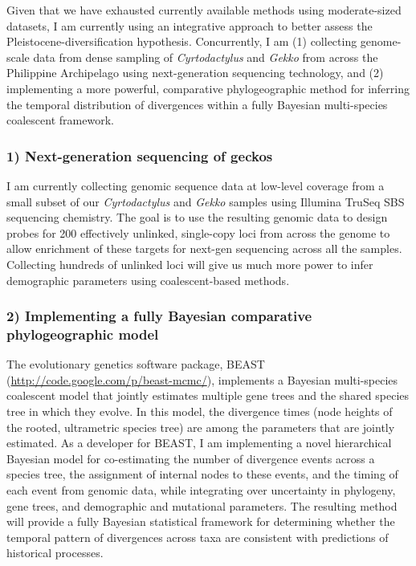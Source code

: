 \documentclass[10pt]{article}
\begin{document}



Given that we have exhausted currently available methods using moderate-sized
datasets, I am currently using an integrative approach to better assess the
Pleistocene-diversification hypothesis.  Concurrently, I am (1) collecting
genome-scale data from dense sampling of \emph{Cyrtodactylus} and \emph{Gekko}
from across the Philippine Archipelago using next-generation sequencing
technology, and (2) implementing a more powerful, comparative phylogeographic
method for inferring the temporal distribution of divergences within a fully
Bayesian multi-species coalescent framework.

\subsubsection*{1) Next-generation sequencing of geckos}
I am currently collecting genomic sequence data at low-level coverage from a
small subset of our \emph{Cyrtodactylus} and \emph{Gekko} samples using
Illumina TruSeq SBS sequencing chemistry.
The goal is to use the resulting genomic data to design probes for 200
effectively unlinked, single-copy loci from across the genome to allow
enrichment of these targets for next-gen sequencing across all the samples.
Collecting hundreds of unlinked loci will give us much more power to infer
demographic parameters using coalescent-based methods.

\subsubsection*{2) Implementing a fully Bayesian comparative phylogeographic
model}
The evolutionary genetics software package, BEAST
(\url{http://code.google.com/p/beast-mcmc/}), implements a Bayesian
multi-species coalescent model that jointly estimates multiple gene trees and
the shared species tree in which they evolve.
In this model, the divergence times (node heights of the rooted, ultrametric
species tree) are among the parameters that are jointly estimated.
As a developer for BEAST, I am implementing a novel hierarchical Bayesian model
for co-estimating the number of divergence events across a species tree, the
assignment of internal nodes to these events, and the timing of each event from
genomic data, while integrating over uncertainty in phylogeny, gene trees, and
demographic and mutational parameters.
The resulting method will provide a fully Bayesian statistical framework
for determining whether the temporal pattern of divergences across taxa are
consistent with predictions of historical processes.
\end{document}
